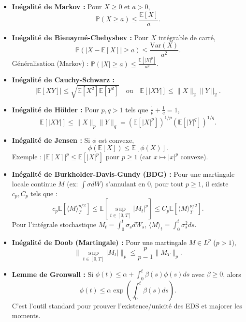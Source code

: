 \documentclass[a4paper,11pt]{article}
\begin{document}
\begin{itemize}
    \item \textbf{Inégalité de Markov :} Pour $X \ge 0$ et $a > 0$,
    \[ \mathbb{P}(X \ge a) \le \frac{\mathbb{E}[X]}{a}. \]
    
    \item \textbf{Inégalité de Bienaymé-Chebyshev :} Pour $X$ intégrable de carré,
    \[ \mathbb{P}(|X - \mathbb{E}[X]| \ge a) \le \frac{\text{Var}(X)}{a^2}. \]
    Généralisation (Markov) : $\mathbb{P}(|X| \ge a) \le \frac{\mathbb{E}[|X|^p]}{a^p}$.

    \item \textbf{Inégalité de Cauchy-Schwarz :}
    \[ |\mathbb{E}[XY]| \le \sqrt{\mathbb{E}[X^2]\mathbb{E}[Y^2]} \quad \text{ou} \quad \mathbb{E}[|XY|] \le \|X\|_2 \|Y\|_2. \]

    \item \textbf{Inégalité de Hölder :} Pour $p, q > 1$ tels que $\frac{1}{p} + \frac{1}{q} = 1$,
    \[ \mathbb{E}[|XY|] \le \|X\|_p \|Y\|_q = (\mathbb{E}[|X|^p])^{1/p} (\mathbb{E}[|Y|^q])^{1/q}. \]

    \item \textbf{Inégalité de Jensen :} Si $\phi$ est convexe,
    \[ \phi(\mathbb{E}[X]) \le \mathbb{E}[\phi(X)]. \]
    Exemple : $|\mathbb{E}[X]|^p \le \mathbb{E}[|X|^p]$ pour $p \ge 1$ (car $x \mapsto |x|^p$ convexe).

    \item \textbf{Inégalité de Burkholder-Davis-Gundy (BDG) :} Pour une martingale locale continue $M$ (ex: $\int \sigma dW$) s'annulant en 0, pour tout $p \ge 1$, il existe $c_p, C_p$ tels que :
    \[ c_p \mathbb{E}[\langle M \rangle_T^{p/2}] \le \mathbb{E}[\sup_{t \in [0,T]} |M_t|^p] \le C_p \mathbb{E}[\langle M \rangle_T^{p/2}]. \]
    Pour l'intégrale stochastique $M_t = \int_0^t \sigma_s dW_s$, $\langle M \rangle_t = \int_0^t \sigma_s^2 ds$.
    
    \item \textbf{Inégalité de Doob (Martingale) :} Pour une martingale $M \in L^p$ ($p>1$),
    \[ \|\sup_{t \in [0,T]} |M_t| \|_p \le \frac{p}{p-1} \|M_T\|_p. \]

    \item \textbf{Lemme de Gronwall :}
    Si $\phi(t) \le \alpha + \int_0^t \beta(s) \phi(s) ds$ avec $\beta \ge 0$, alors
    \[ \phi(t) \le \alpha \exp\left( \int_0^t \beta(s) ds \right). \]
    C'est l'outil standard pour prouver l'existence/unicité des EDS et majorer les moments.
\end{itemize}
\end{document}
